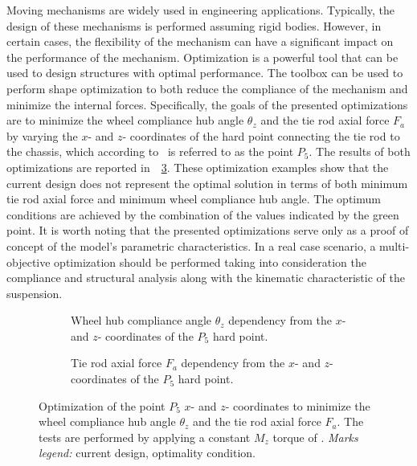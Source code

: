 Moving mechanisms are widely used in engineering applications. Typically, the design of these mechanisms is performed assuming rigid bodies. However, in certain cases, the flexibility of the mechanism can have a significant impact on the performance of the mechanism. Optimization is a powerful tool that can be used to design structures with optimal performance. The \TrussMe{} toolbox can be used to perform shape optimization to both reduce the compliance of the mechanism and minimize the internal forces. Specifically, the goals of the presented optimizations are to minimize the wheel compliance hub angle $\theta_z$ and the tie rod axial force $F_a$ by varying the $x$- and $z$- coordinates of the hard point connecting the tie rod to the chassis, which according to~\cite{larcher2024symbolic} is referred to as the point $P_5$. The results of both optimizations are reported in~\figurename{}~\ref{chap7:fig:optimization}. These optimization examples show that the current design does not represent the optimal solution in terms of both minimum tie rod axial force and minimum wheel compliance hub angle. The optimum conditions are achieved by the combination of the values indicated by the green point. It is worth noting that the presented optimizations serve only as a proof of concept of the model's parametric characteristics. In a real case scenario, a multi-objective optimization should be performed taking into consideration the compliance and structural analysis along with the kinematic characteristic of the suspension.

\begin{figure}[!ht]
  \centering
    \begin{subfigure}[t]{0.49\textwidth}
    \small{}
    \caption{Wheel hub compliance angle $\theta_z$ dependency from the $x$- and $z$- coordinates of the $P_5$ hard point.}
    \label{chap7:fig:variation_theta_z}
  \end{subfigure}
  \hfill
  \begin{subfigure}[t]{0.49\textwidth}
    \centering
    \small{}
    \caption{Tie rod axial force $F_a$ dependency from the $x$- and $z$- coordinates of the $P_5$ hard point.}
    \label{chap7:fig:variation_force_tie}
  \end{subfigure}
  \caption{Optimization of the point $P_5$ $x$- and $z$- coordinates to minimize the wheel compliance hub angle $\theta_z$ and the tie rod axial force $F_a$. The tests are performed by applying a constant $M_z$ torque of . \emph{Marks legend:} {\color{mycolor2}\raisebox{-.15pt}{\Large$\bullet$}} current design, {\color{mycolor5}\raisebox{-.15pt}{\Large$\bullet$}} optimality condition.}
  \label{chap7:fig:optimization}
\end{figure}

